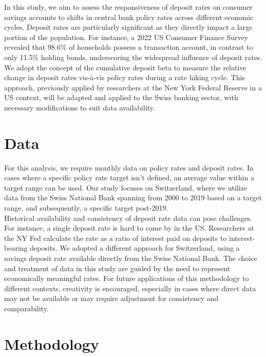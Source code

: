 \documentclass{article}
\begin{document}
In this study, we aim to assess the responsiveness of deposit rates on consumer savings accounts to shifts in central bank policy rates across different economic cycles. Deposit rates are particularly significant as they directly impact a large portion of the population. For instance, a 2022 US Consumer Finance Survey revealed that 98.6\% of households possess a transaction account, in contrast to only 11.5\% holding bonds\cite{scf2022}, underscoring the widespread influence of deposit rates.\\

We adopt the concept of the cumulative deposit beta to measure the relative change in deposit rates vis-à-vis policy rates during a rate hiking cycle. This approach, previously applied by researchers at the New York Federal Reserve in a US context\cite{deposit2023}, will be adapted and applied to the Swiss banking sector, with necessary modifications to suit data availability.

\section{Data}

For this analysis, we require monthly data on policy rates and deposit rates. In cases where a specific policy rate target isn't defined, an average value within a target range can be used. Our study focuses on Switzerland, where we utilize data from the Swiss National Bank spanning from 2000 to 2019 based on a target range, and subsequently, a specific target post-2019.\\

Historical availability and consistency of deposit rate data can pose challenges. For instance, a single deposit rate is hard to come by in the US. Researchers at the NY Fed calculate the rate as a ratio of interest paid on deposits to interest-bearing deposits\cite{deposit2023}. We adopted a different approach for Switzerland, using a savings deposit rate available directly from the Swiss National Bank. The choice and treatment of data in this study are guided by the need to represent economically meaningful rates. For future applications of this methodology to different contexts, creativity is encouraged, especially in cases where direct data may not be available or may require adjustment for consistency and comparability.\\

\section{Methodology}
\end{document}
